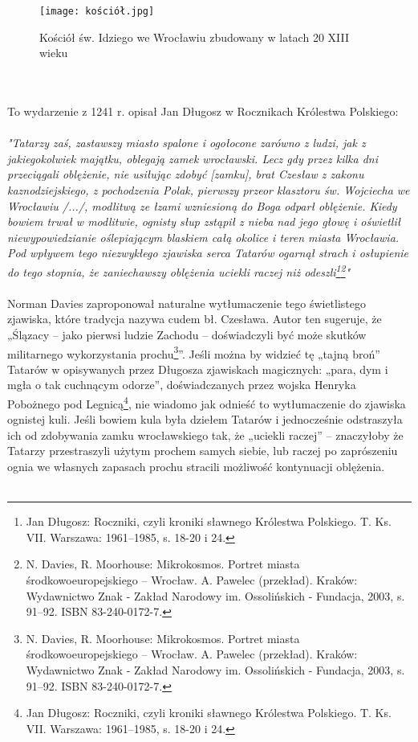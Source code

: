 \documentclass[12pt]{article}
\begin{document}
\begin{figure}[h]
    \centering
    \texttt{[image: kościół.jpg]}
    \caption{Kościół św. Idziego we Wrocławiu zbudowany w latach 20 XIII wieku}
    \label{fig:kościół}
\end{figure}\\\\
To wydarzenie z 1241 r. opisał Jan Długosz w Rocznikach Królestwa Polskiego:\\\\
\textit{"Tatarzy zaś, zastawszy miasto spalone i ogołocone zarówno z ludzi, jak z jakiegokolwiek majątku, oblegają zamek wrocławski. Lecz gdy przez kilka dni przeciągali oblężenie, nie usiłując zdobyć [zamku], brat Czesław z zakonu kaznodziejskiego, z pochodzenia Polak, pierwszy przeor klasztoru św. Wojciecha we Wrocławiu /.../, modlitwą ze łzami wzniesioną do Boga odparł oblężenie. Kiedy bowiem trwał w modlitwie, ognisty słup zstąpił z nieba nad jego głowę i oświetlił niewypowiedzianie oślepiającym blaskiem całą okolice i teren miasta Wrocławia. Pod wpływem tego niezwykłego zjawiska serca Tatarów ogarnął strach i osłupienie do tego stopnia, że zaniechawszy oblężenia uciekli raczej niż odeszli\footnote{Jan Długosz: Roczniki, czyli kroniki sławnego Królestwa Polskiego. T. Ks. VII. Warszawa: 1961–1985, s. 18-20 i 24.}\footnote{N. Davies, R. Moorhouse: Mikrokosmos. Portret miasta środkowoeuropejskiego – Wrocław. A. Pawelec (przekład). Kraków: Wydawnictwo Znak - Zakład Narodowy im. Ossolińskich - Fundacja, 2003, s. 91–92. ISBN 83-240-0172-7.}"}\\\\
Norman Davies zaproponował naturalne wytłumaczenie tego świetlistego zjawiska, które tradycja nazywa cudem bł. Czesława. Autor ten sugeruje, że „Ślązacy – jako pierwsi ludzie Zachodu – doświadczyli być może skutków militarnego wykorzystania prochu\footnote{N. Davies, R. Moorhouse: Mikrokosmos. Portret miasta środkowoeuropejskiego – Wrocław. A. Pawelec (przekład). Kraków: Wydawnictwo Znak - Zakład Narodowy im. Ossolińskich - Fundacja, 2003, s. 91–92. ISBN 83-240-0172-7.}”. Jeśli można by widzieć tę „tajną broń” Tatarów w opisywanych przez Długosza zjawiskach magicznych: „para, dym i mgła o tak cuchnącym odorze”, doświadczanych przez wojska Henryka Pobożnego pod Legnicą\footnote{Jan Długosz: Roczniki, czyli kroniki sławnego Królestwa Polskiego. T. Ks. VII. Warszawa: 1961–1985, s. 18-20 i 24.}, nie wiadomo jak odnieść to wytłumaczenie do zjawiska ognistej kuli. Jeśli bowiem kula była dziełem Tatarów i jednocześnie odstraszyła ich od zdobywania zamku wrocławskiego tak, że „uciekli raczej” – znaczyłoby że Tatarzy przestraszyli użytym prochem samych siebie, lub raczej po zaprószeniu ognia we własnych zapasach prochu stracili możliwość kontynuacji oblężenia.\\\\
\end{document}
